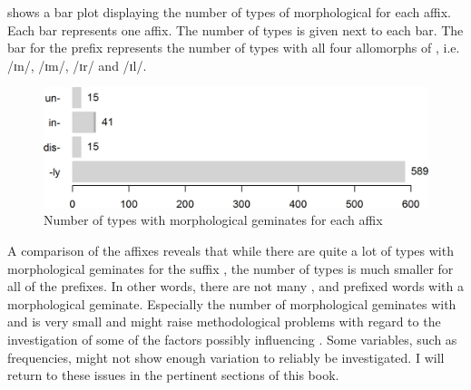   shows a bar plot displaying the number of types of morphological  for each affix. Each bar represents one affix. The number of types is given next to each bar. The bar for the prefix   represents the number of types with all four allomorphs of , i.e. /ɪn/, /ɪm/, /ɪr/ and /ɪl/. 
 
\begin{figure}  
	
	\includegraphics[scale=0.75]{images/Theory/NumberOfMorphGemAffixes.png}
 
	\caption{ Number of types with morphological geminates for each affix}
	\label{fig:morphological geminates for each affix}
\end{figure}

A comparison of the affixes reveals that while there are quite a lot of types with morphological geminates for the suffix , the number of types is much smaller for all of the prefixes. In other words, there are not many ,  and prefixed words with a {morphological geminate}. Especially the number of morphological geminates with  and  is very small and might raise methodological problems with regard to the investigation of some of the factors possibly influencing . Some variables, such as frequencies, might not show enough variation to reliably be investigated. I will return to these issues in the pertinent sections of this book.

